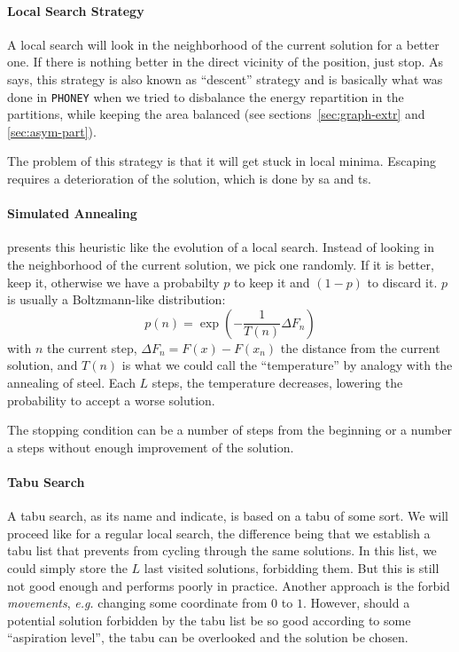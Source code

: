\documentclass[11pt,a4paper]{report} %
\theoremstyle{customdef}
\begin{document}
\paragraph{Local Search Strategy}
A local search will look in the neighborhood of the current solution for a better one.
If there is nothing better in the direct vicinity of the position, just stop.
As \citet{Pirlot1996} says, this strategy is also known as “descent” strategy and is basically what was done in \texttt{PHONEY} when we tried to disbalance the energy repartition in the partitions, while keeping the area balanced (see sections~\ref{sec:graph-extr} and \ref{sec:asym-part}).

The problem of this strategy is that it will get stuck in local minima.
Escaping requires a deterioration of the solution, which is done by \gls{sa} and \gls{ts}.

\paragraph{Simulated Annealing}
\citet{Pirlot1996} presents this heuristic like the evolution of a local search.
Instead of looking in the neighborhood of the current solution, we pick one randomly.
If it is better, keep it, otherwise we have a probabilty $p$ to keep it and $(1-p)$ to discard it.
$p$ is usually a Boltzmann-like distribution:
\[p(n) = \exp{\left(-\frac{1}{T(n)} \Delta F_n\right)}\]
with $n$ the current step, $\Delta F_n = F(x) - F(x_n)$ the distance from the current solution, and $T(n)$ is what we could call the “temperature” by analogy with the annealing of steel.
Each $L$ steps, the temperature decreases, lowering the probability to accept a worse solution.

The stopping condition can be a number of steps from the beginning or a number a steps without enough improvement of the solution.

\paragraph{Tabu Search}
A tabu search, as its name and \citet{Pirlot1996} indicate, is based on a tabu of some sort.
We will proceed like for a regular local search, the difference being that we establish a tabu list that prevents from cycling through the same solutions.
In this list, we could simply store the $L$ last visited solutions, forbidding them.
But this is still not good enough and performs poorly in practice.
Another approach is the forbid \textit{movements}, \textit{e.g.} changing some coordinate from $0$ to $1$.
However, should a potential solution forbidden by the tabu list be so good according to some “aspiration level”, the tabu can be overlooked and the solution be chosen.
\end{document}
